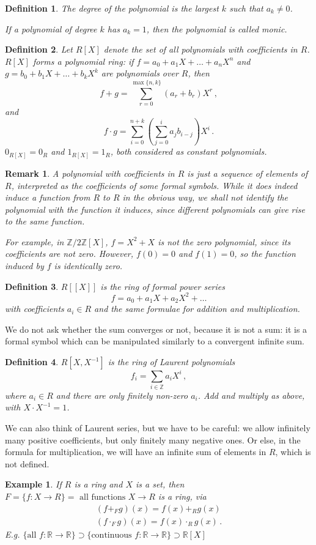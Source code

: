 \documentclass{article}
\theoremstyle{plain}\theoremheaderfont{\normalfont\itshape}\theorembodyfont{\rmfamily}\theoremseparator{.}\newtheorem*{rem}{Remark}\newtheorem*{ex}{Example}\newtheorem*{proof}{Proof}\newtheorem*{altp}{Alternative proof}\newtheorem*{nonex}{Non-Example}
\theoremstyle{plain}\theoremheaderfont{\normalfont\bfseries}\theorembodyfont{\rmfamily}\theoremseparator{.}\newtheorem{thm}{Theorem}[section]\newtheorem{lem}[thm]{Lemma}\newtheorem{prop}[thm]{Proposition}\newtheorem*{cor}{Corollary}\newtheorem{defn}[thm]{Definition}\newtheorem{clm}[thm]{Claim}\newtheorem{clminproof}{Claim}\newtheorem*{notn}{Notation}\newtheorem*{exer}{Exercise}\newtheorem*{lemnn}{Lemma}
\theoremstyle{break}\theoremheaderfont{\normalfont\itshape}\theorembodyfont{\rmfamily}\theoremseparator{.\medskip}\newtheorem*{proofskip}{Proof}\newtheorem*{exs}{Examples}\newtheorem*{rems}{Remarks}\newtheorem*{obs}{Observations}
\theoremstyle{break}\theoremheaderfont{\normalfont\bfseries}\theorembodyfont{\rmfamily}\theoremseparator{.\medskip}\newtheorem{lemskip}[thm]{Lemma}\newtheorem{defnskip}[thm]{Definition}\newtheorem{propskip}[thm]{Proposition}\newtheorem{thmskip}[thm]{Theorem}
\numberwithin{equation}{section}
\newcommand{\ZZ}{\mathbb{Z}}
\newcommand{\RR}{\mathbb{R}}
\begin{document}
    \begin{defn}
        The \textit{degree} of the polynomial is the largest \(k\) such that \(a_k\ne 0\).

        If a polynomial of degree \(k\) has \(a_k=1\), then the polynomial is called \textit{monic}.
    \end{defn}
    \begin{defn}
        Let \(R[X]\) denote the set of all polynomials with coefficients in \(R\). \(R[X]\) forms a \textit{polynomial ring}: if \(f=a_0+a_1X+\dots+a_nX^n\) and \(g=b_0+b_1X+\dots+b_kX^k\) are polynomials over \(R\), then
        \[f+g=\sum_{r=0}^{\max\{n,k\}}(a_r+b_r)X^r\,,\]
        and
        \[f\cdot g=\sum_{i=0}^{n+k}\left(\sum_{j=0}^{i}a_j b_{i-j}\right)X^i\,.\]
        \(0_{R[X]}=0_R\) and \(1_{R[X]}=1_R\), both considered as constant polynomials.
    \end{defn}
    \begin{rem}
        A polynomial with coefficients in \(R\) is just a sequence of elements of \(R\), interpreted as the coefficients of some formal symbols. While it does indeed induce a function from \(R\) to \(R\) in the obvious way, we shall not identify the polynomial with the function it induces, since different polynomials can give rise to the same function.
        
        For example, in \(\ZZ/2\ZZ[X]\), \(f=X^2+X\) is not the zero polynomial, since its coefficients are not zero. However, \(f(0)=0\) and \(f(1)=0\), so the function induced by \(f\) is identically zero.
    \end{rem}
    \begin{defn}
        \(R[[X]]\) is the ring of formal \textit{power series}
        \[f=a_0+a_1X+a_2X^2+\dots\]
        with coefficients \(a_i\in R\) and the same formulae for addition and multiplication.
    \end{defn}
    We do not ask whether the sum converges or not, because it is not a sum: it is a formal symbol which can be manipulated similarly to a convergent infinite sum.
    \begin{defn}
        \(R[X,X^{-1}]\) is the ring of \textit{Laurent polynomials}
        \[f_i=\sum_{i\in\ZZ}a_iX^i\,,\]
        where \(a_i\in R\) and there are only finitely non-zero \(a_i\). Add and multiply as above, with \(X\cdot X^{-1}=1\).
    \end{defn}
    We can also think of Laurent series, but we have to be careful: we allow infinitely many positive coefficients, but only finitely many negative ones. Or else, in the formula for multiplication, we will have an infinite sum of elements in \(R\), which is not defined.
    \begin{ex}
        If \(R\) is a ring and \(X\) is a set, then \(F=\{f:X\to R\}=\text{ all functions }X\to R\) is a ring, via
        \begin{align*}
            (f+_F g)(x)=f(x)+_R g(x)\\
            (f\cdot_F g)(x)=f(x)\cdot_R g(x)\,.
        \end{align*}
        E.g. \(\{\text{all }f:\RR\to\RR\}\supset\{\text{continuous }f:\RR\to\RR\}\supset\RR[X]\)
    \end{ex}
\end{document}
